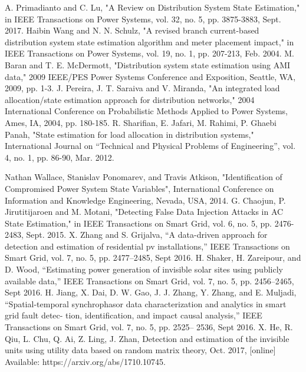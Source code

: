 \begin{thebibliography}{00}
   A. Primadianto and C. Lu, "A Review on Distribution System State Estimation," in IEEE Transactions on Power Systems, vol. 32, no. 5, pp. 3875-3883, Sept. 2017.
   Haibin Wang and N. N. Schulz, "A revised branch current-based distribution system state estimation algorithm and meter placement impact," in IEEE Transactions on Power Systems, vol. 19, no. 1, pp. 207-213, Feb. 2004.
   M. Baran and T. E. McDermott, "Distribution system state estimation using AMI data," 2009 IEEE/PES Power Systems Conference and Exposition, Seattle, WA, 2009, pp. 1-3.
   J. Pereira, J. T. Saraiva and V. Miranda, "An integrated load allocation/state estimation approach for distribution networks," 2004 International Conference on Probabilistic Methods Applied to Power Systems, Ames, IA, 2004, pp. 180-185.
   R. Sharifian, E. Jafari, M. Rahimi, P. Ghaebi Panah, "State estimation for load allocation in distribution systems," International Journal on “Technical and Physical Problems of Engineering”, vol. 4, no. 1, pp. 86-90, Mar. 2012.

   Nathan Wallace, Stanislav Ponomarev, and Travis Atkison, "Identification of Compromised Power System State Variables", International Conference on Information and Knowledge Engineering, Nevada, USA, 2014.
   G. Chaojun, P. Jirutitijaroen and M. Motani, "Detecting False Data Injection Attacks in AC State Estimation," in IEEE Transactions on Smart Grid, vol. 6, no. 5, pp. 2476-2483, Sept. 2015.
   X. Zhang and S. Grijalva, “A data-driven approach for detection and estimation of residential pv installations,” IEEE Transactions on Smart Grid, vol. 7, no. 5, pp. 2477–2485, Sept 2016.
   H. Shaker, H. Zareipour, and D. Wood, “Estimating power generation of invisible solar sites using publicly available data,” IEEE Transactions on Smart Grid, vol. 7, no. 5, pp. 2456–2465, Sept 2016.
   H. Jiang, X. Dai, D. W. Gao, J. J. Zhang, Y. Zhang, and E. Muljadi, “Spatial-temporal synchrophasor data characterization and analytics in smart grid fault detec- tion, identification, and impact causal analysis,” IEEE Transactions on Smart Grid, vol. 7, no. 5, pp. 2525– 2536, Sept 2016.
   X. He, R. Qiu, L. Chu, Q. Ai, Z. Ling, J. Zhan, Detection and estimation of the invisible units using utility data based on random matrix theory, Oct. 2017, [online] Available: https://arxiv.org/abs/1710.10745.


\end{thebibliography}
